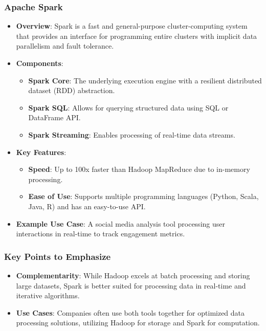 \documentclass{beamer}
\begin{document}
\begin{frame}[fragile]
    \frametitle{Apache Spark}
    \begin{itemize}
        \item \textbf{Overview}: Spark is a fast and general-purpose cluster-computing system that provides an interface for programming entire clusters with implicit data parallelism and fault tolerance.
        
        \item \textbf{Components}:
            \begin{itemize}
                \item \textbf{Spark Core}: The underlying execution engine with a resilient distributed dataset (RDD) abstraction.
                \item \textbf{Spark SQL}: Allows for querying structured data using SQL or DataFrame API.
                \item \textbf{Spark Streaming}: Enables processing of real-time data streams.
            \end{itemize}
        
        \item \textbf{Key Features}:
            \begin{itemize}
                \item \textbf{Speed}: Up to 100x faster than Hadoop MapReduce due to in-memory processing.
                \item \textbf{Ease of Use}: Supports multiple programming languages (Python, Scala, Java, R) and has an easy-to-use API.
            \end{itemize}
        
        \item \textbf{Example Use Case}: A social media analysis tool processing user interactions in real-time to track engagement metrics.
    \end{itemize}
\end{frame}

\begin{frame}[fragile]
    \frametitle{Key Points to Emphasize}
    \begin{itemize}
        \item \textbf{Complementarity}: While Hadoop excels at batch processing and storing large datasets, Spark is better suited for processing data in real-time and iterative algorithms.
        \item \textbf{Use Cases}: Companies often use both tools together for optimized data processing solutions, utilizing Hadoop for storage and Spark for computation.
    \end{itemize}
\end{frame}
\end{document}
